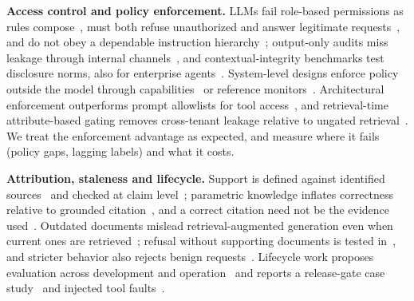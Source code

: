 \documentclass[conference,a4paper]{IEEEtran}
\begin{document}
\textbf{Access control and policy enforcement.} LLMs fail role-based permissions as rules compose~\cite{sanyal2026orgaccess}, must both refuse unauthorized and answer legitimate requests~\cite{fazlija2025accessdenied}, and do not obey a dependable instruction hierarchy~\cite{geng2026controlillusion}; output-only audits miss leakage through internal channels~\cite{elyagoubi2026agentleak}, and contextual-integrity benchmarks test disclosure norms, also for enterprise agents~\cite{mireshghallah2024confaide,fu2026ciwork}. System-level designs enforce policy outside the model through capabilities~\cite{debenedetti2025camel} or reference monitors~\cite{palumbo2026policy}. Architectural enforcement outperforms prompt allowlists for tool access~\cite{uppala2026promptsdontprotect}, and retrieval-time attribute-based gating removes cross-tenant leakage relative to ungated retrieval~\cite{arceo2026securing}. We treat the enforcement advantage as expected, and measure where it fails (policy gaps, lagging labels) and what it costs.

\textbf{Attribution, staleness and lifecycle.} Support is defined against identified sources~\cite{rashkin2023ais} and checked at claim level~\cite{gao2023alce}; parametric knowledge inflates correctness relative to grounded citation~\cite{song2025trustscore}, and a correct citation need not be the evidence used~\cite{wallat2025correctness}. Outdated documents mislead retrieval-augmented generation even when current ones are retrieved~\cite{ouyang2025hoh}; refusal without supporting documents is tested in~\cite{chen2024rgb}, and stricter behavior also rejects benign requests~\cite{cui2025orbench}. Lifecycle work proposes evaluation across development and operation~\cite{xia2024eddops} and reports a release-gate case study~\cite{maiorano2026qualitygate} and injected tool faults~\cite{gupta2026reliabilitybench}.
\end{document}
